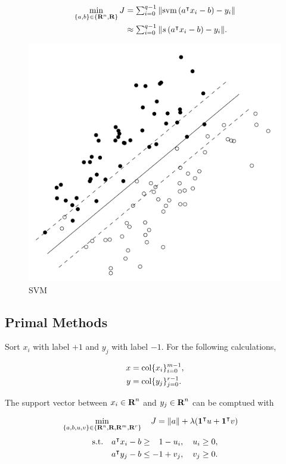 \documentclass{article}
\begin{document}
    \begin{align*}
        \min_{\{a,b\}\in\{\textbf{R}^n,\textbf{R}\}}J
        &= \textstyle\sum_{i=0}^{q-1} \|\text{svm}\left(a^\intercal x_i - b\right)-y_i\|\\
        &\approx \textstyle\sum_{i=0}^{q-1} \|s\left(a^\intercal x_i - b\right)-y_i\|.
    \end{align*}

    \begin{figure}[h!]
        \centering
        \includegraphics[width=.5\textwidth]{./figs/svm/svm.png}
        \caption{SVM}
        \label{fig:svm}
    \end{figure}

\clearpage

\subsection{Primal Methods}

    Sort $x_i$ with label $+1$ 
    and $y_j$ with label $-1$.
    For the following calculations,

    \begin{align*}
        x &= \text{col}\{x_i\}_{i=0}^{m-1},
        \\
        y &= \text{col}\{y_j\}_{j=0}^{r-1}.
    \end{align*}

    The support vector between $x_i\in\textbf{R}^n$ and $y_j\in\textbf{R}^n$
    can be comptued with \cite[p.~427]{bv_cvxbook}
    
    \begin{align*}
        \min_{\{a,b,u,v\}\in\{\textbf{R}^n,\textbf{R},\textbf{R}^m,\textbf{R}^r\}} \quad 
        J & = \|a\|+\lambda (\textbf{1}^\intercal u + \textbf{1}^\intercal v)
    \end{align*}
    \begin{align*}
        \st\quad a^\tp x_i - b &\geq \minus 1-u_i,\quad u_i\geq 0,\\
                    a^\tp y_j - b &\leq -1+v_j,\quad v_j\geq 0.
    \end{align*}    
\end{document}
